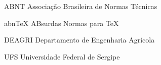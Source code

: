 
\begin{siglas}
	\item[ABNT]{Associação Brasileira de Normas Técnicas}
	\item[abnTeX]{ABsurdas Normas para TeX}
  	\item[DEAGRI]{Departamento de Engenharia Agrícola}
	\item[UFS]{Universidade Federal de Sergipe}
\end{siglas}